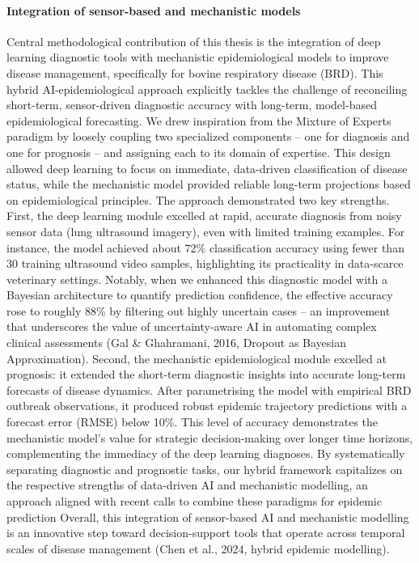 \paragraph{Integration of sensor-based and mechanistic models} Central methodological contribution of this thesis is the integration of deep learning diagnostic tools with mechanistic epidemiological models to improve disease management, specifically for bovine respiratory disease (BRD). This hybrid AI-epidemiological approach explicitly tackles the challenge of reconciling short-term, sensor-driven diagnostic accuracy with long-term, model-based epidemiological forecasting. We drew inspiration from the Mixture of Experts paradigm by loosely coupling two specialized components – one for diagnosis and one for prognosis – and assigning each to its domain of expertise. This design allowed deep learning to focus on immediate, data-driven classification of disease status, while the mechanistic model provided reliable long-term projections based on epidemiological principles. The approach demonstrated two key strengths. First, the deep learning module excelled at rapid, accurate diagnosis from noisy sensor data (lung ultrasound imagery), even with limited training examples. For instance, the model achieved about 72\% classification accuracy using fewer than 30 training ultrasound video samples, highlighting its practicality in data-scarce veterinary settings. Notably, when we enhanced this diagnostic model with a Bayesian architecture to quantify prediction confidence, the effective accuracy rose to roughly 88\% by filtering out highly uncertain cases – an improvement that underscores the value of uncertainty-aware AI in automating complex clinical assessments (Gal \& Ghahramani, 2016, Dropout as Bayesian Approximation). Second, the mechanistic epidemiological module excelled at prognosis: it extended the short-term diagnostic insights into accurate long-term forecasts of disease dynamics. After parametrising the model with empirical BRD outbreak observations, it produced robust epidemic trajectory predictions with a forecast error (RMSE) below 10\%. This level of accuracy demonstrates the mechanistic model’s value for strategic decision-making over longer time horizons, complementing the immediacy of the deep learning diagnoses. By systematically separating diagnostic and prognostic tasks, our hybrid framework capitalizes on the respective strengths of data-driven AI and mechanistic modelling, an approach aligned with recent calls to combine these paradigms for epidemic prediction Overall, this integration of sensor-based AI and mechanistic modelling is an innovative step toward decision-support tools that operate across temporal scales of disease management (Chen et al., 2024, hybrid epidemic modelling).



